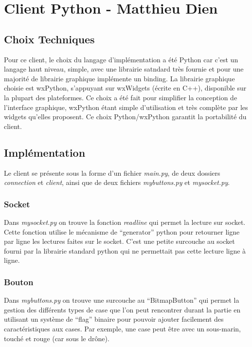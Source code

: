 \documentclass[a4paper, 11pt]{report}
\begin{document}
\chapter{Client Python - Matthieu Dien}

\section{Choix Techniques}

Pour ce client, le choix du langage d'implémentation a été Python car c'est un langage haut niveau, simple, 
avec une librairie satndard très fournie et pour une majorité de librairie graphique implémente
un binding. La librairie graphique choisie est wxPython, s'appuyant sur wxWidgets (écrite en C++), disponible 
sur la plupart des plateformes.
Ce choix a été fait pour simplifier la conception de l'interface graphique, wxPython étant simple d'utilisation et 
très complète par les widgets qu'elles proposent. Ce choix Python/wxPython garantit la portabilité du client.

\section{Implémentation}

Le client se présente sous la forme d'un fichier \emph{main.py}, de deux dossiers 
\emph{connection} et \emph{client}, ainsi que de deux fichiers
\emph{mybuttons.py} et \emph{mysocket.py}.

\subsection{Socket}
Dans \emph{mysocket.py} on trouve la fonction \emph{readline} 
qui permet la lecture sur socket. Cette fonction utilise le mécanisme de ``generator'' python pour retourner ligne par ligne 
les lectures faites sur le socket. C'est une petite surcouche au socket fourni par la librairie standard python qui ne permettait pas cette 
lecture ligne à ligne.

\subsection{Bouton}
Dans \emph{mybuttons.py} on trouve une surcouche au ``BitmapButton'' qui permet la gestion des différents types de 
case que l'on peut rencontrer durant la partie en utilisant un système de ``flag'' binaire pour pouvoir ajouter facilement des caractéristiques aux cases.
Par exemple, une case peut être avec un sous-marin, touché et rouge (car sous le drône).
\end{document}
